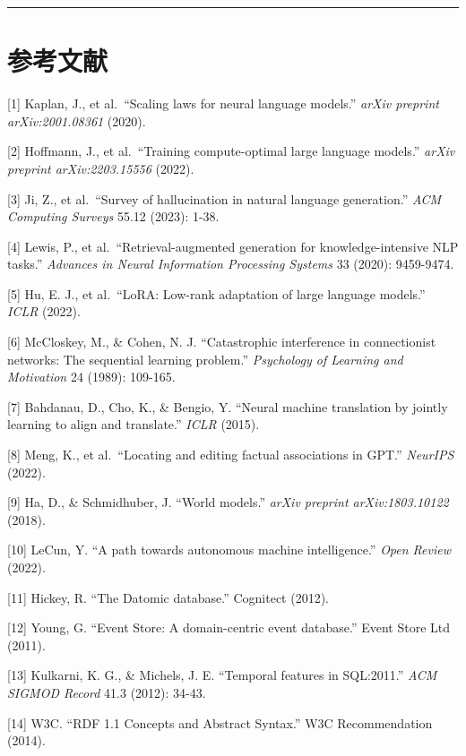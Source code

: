 \documentclass[11pt,a4paper]{ctexart}
\begin{document}
\begin{center}\rule{0.5\linewidth}{0.5pt}\end{center}

\section{参考文献}\label{ux53c2ux8003ux6587ux732e}

{[}1{]} Kaplan, J., et al.~``Scaling laws for neural language models.''
\emph{arXiv preprint arXiv:2001.08361} (2020).

{[}2{]} Hoffmann, J., et al.~``Training compute-optimal large language
models.'' \emph{arXiv preprint arXiv:2203.15556} (2022).

{[}3{]} Ji, Z., et al.~``Survey of hallucination in natural language
generation.'' \emph{ACM Computing Surveys} 55.12 (2023): 1-38.

{[}4{]} Lewis, P., et al.~``Retrieval-augmented generation for
knowledge-intensive NLP tasks.'' \emph{Advances in Neural Information
Processing Systems} 33 (2020): 9459-9474.

{[}5{]} Hu, E. J., et al.~``LoRA: Low-rank adaptation of large language
models.'' \emph{ICLR} (2022).

{[}6{]} McCloskey, M., \& Cohen, N. J. ``Catastrophic interference in
connectionist networks: The sequential learning problem.''
\emph{Psychology of Learning and Motivation} 24 (1989): 109-165.

{[}7{]} Bahdanau, D., Cho, K., \& Bengio, Y. ``Neural machine
translation by jointly learning to align and translate.'' \emph{ICLR}
(2015).

{[}8{]} Meng, K., et al.~``Locating and editing factual associations in
GPT.'' \emph{NeurIPS} (2022).

{[}9{]} Ha, D., \& Schmidhuber, J. ``World models.'' \emph{arXiv
preprint arXiv:1803.10122} (2018).

{[}10{]} LeCun, Y. ``A path towards autonomous machine intelligence.''
\emph{Open Review} (2022).

{[}11{]} Hickey, R. ``The Datomic database.'' Cognitect (2012).

{[}12{]} Young, G. ``Event Store: A domain-centric event database.''
Event Store Ltd (2011).

{[}13{]} Kulkarni, K. G., \& Michels, J. E. ``Temporal features in
SQL:2011.'' \emph{ACM SIGMOD Record} 41.3 (2012): 34-43.

{[}14{]} W3C. ``RDF 1.1 Concepts and Abstract Syntax.'' W3C
Recommendation (2014).
\end{document}
